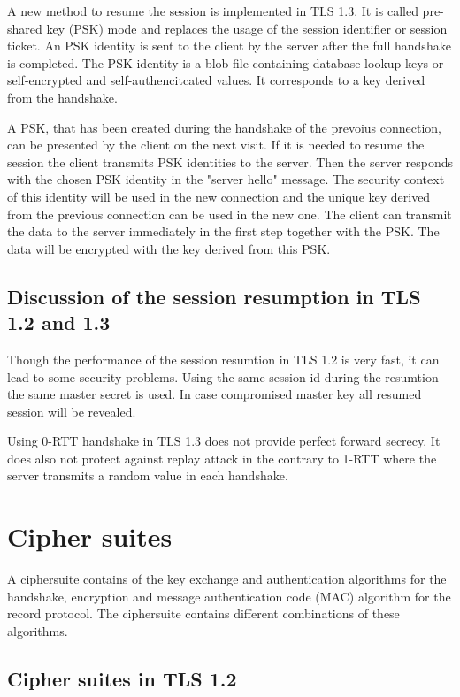 A new method to resume the session is implemented in TLS 1.3. It is called pre-shared key (PSK) mode and replaces the usage of the session identifier or session ticket. An PSK identity is sent to the client by the server after the full handshake is completed. The PSK identity is a blob file containing database lookup keys or self-encrypted and self-authencitcated values. It corresponds to a key derived from the handshake.

A PSK, that has been created during the handshake of the prevoius connection, can be presented by the client on the next visit. If it is needed to resume the session the client transmits PSK identities to the server. Then the server responds with the chosen PSK identity in the "server hello" message. The security context of this identity will be used in the new connection and the unique key derived from the previous connection can be used in the new one. 
The client can transmit the data to the server immediately in the first step together with the PSK. The data will be encrypted with the key derived from this PSK.\cite{ldapwiki:resumption}

\subsection{Discussion of the session resumption in TLS 1.2 and 1.3}
\label{subsec:discussion_resumption}

Though the performance of the session resumtion in TLS 1.2 is very fast, it can lead to some security problems. Using the same session id during the resumtion the same master secret is used. In case compromised master key all resumed session will be revealed.

Using 0-RTT handshake in TLS 1.3 does not provide perfect forward secrecy. It does also not protect against replay attack in the contrary to 1-RTT where the server transmits a random value in each handshake.


\section{Cipher suites}
\label{sec:comparison_ciphersuits}

A ciphersuite contains of the key exchange and authentication algorithms for the handshake, encryption and message authentication code (MAC) algorithm for the record protocol. The ciphersuite contains different combinations of these algorithms.

\subsection{Cipher suites in TLS 1.2}
\label{subsec:ciphersuits1_2}

